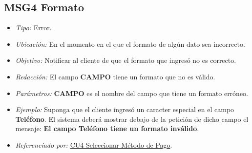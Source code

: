 \hypertarget{MSG4:Formato}{}
\subsection{MSG4 Formato}

\begin{itemize}
	
	\item \textit{Tipo:} Error.
	
	\item\textit{Ubicación:}  En el momento en el que el formato de algún dato sea incorrecto.
	
	\item \textit{Objetivo:} Notificar al cliente de que el formato que ingresó no es correcto.
	
	\item \textit{Redacción:} El campo \textbf{CAMPO} tiene un formato que no es válido.
	
	\item \textit{Parámetros:} \textbf{CAMPO} es el nombre del campo que tiene un formato erróneo.
	
	\item \textit{Ejemplo:} Suponga que el cliente ingresó un caracter especial en el campo \textbf{Teléfono}. El sistema deberá mostrar debajo de la petición de dicho campo el mensaje: \textbf{El campo Teléfono tiene un formato inválido}.
	
	\item \textit{Referenciado por:} \hyperlink{CU4}{CU4 Seleccionar Método de Pago}.
	
\end{itemize}
